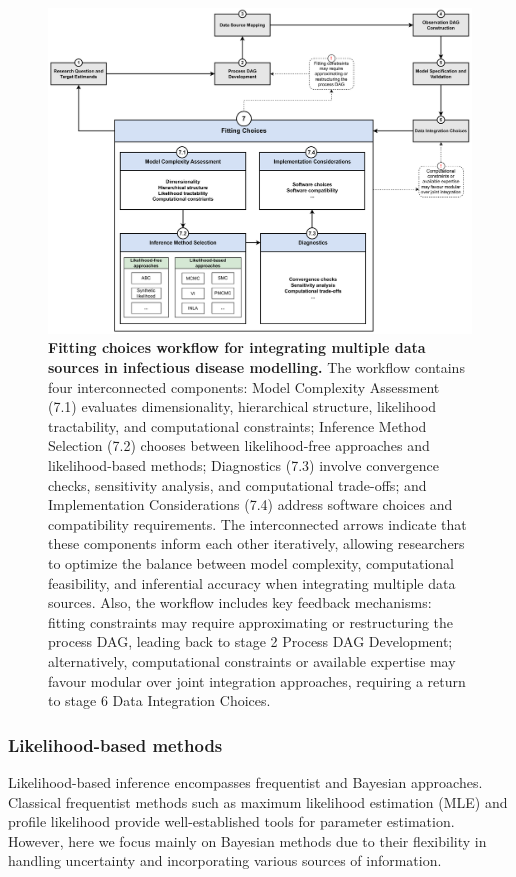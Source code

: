\documentclass{article}
\begin{document}
\begin{figure}[htbp]
    \centering
    \includegraphics[width=\textwidth]{figures/subpanel_fitting choices.drawio.pdf}
    \caption{\textbf{Fitting choices workflow for integrating multiple data sources in infectious disease modelling.} The workflow contains four interconnected components: Model Complexity Assessment (7.1) evaluates dimensionality, hierarchical structure, likelihood tractability, and computational constraints; Inference Method Selection (7.2) chooses between likelihood-free approaches and likelihood-based methods; Diagnostics (7.3) involve convergence checks, sensitivity analysis, and computational trade-offs; and Implementation Considerations (7.4) address software choices and compatibility requirements. The interconnected arrows indicate that these components inform each other iteratively, allowing researchers to optimize the balance between model complexity, computational feasibility, and inferential accuracy when integrating multiple data sources. Also, the workflow includes key feedback mechanisms: fitting constraints may require approximating or restructuring the process DAG, leading back to stage 2 Process DAG Development; alternatively, computational constraints or available expertise may favour modular over joint integration approaches, requiring a return to stage 6 Data Integration Choices. }
    \label{fig:fitting}
\end{figure}


\subsubsection{Likelihood-based methods}
Likelihood-based inference encompasses frequentist and Bayesian approaches. Classical frequentist methods such as maximum likelihood estimation (MLE)\citep{myung2003tutorial, baltazar2024maximum} and profile likelihood \citep{tonsing2018profile, plank2024structured} provide well-established tools for parameter estimation. However, here we focus mainly on Bayesian methods due to their flexibility in handling uncertainty and incorporating various sources of information.
\end{document}
